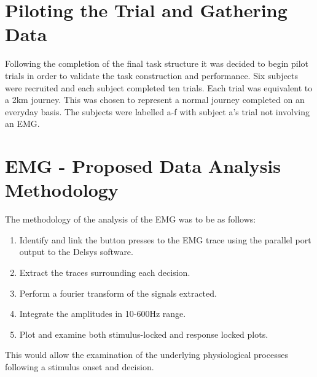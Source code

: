 \section{Piloting the Trial and Gathering Data}
Following the completion of the final task structure it was decided to begin pilot trials in order to validate the task construction and performance. Six subjects were recruited and each subject completed ten trials. Each trial was equivalent to a 2km journey. This was chosen to represent a normal journey completed on an everyday basis. The subjects were labelled a-f with subject a's trial not involving an EMG.


\section{EMG - Proposed Data Analysis Methodology}
The methodology of the analysis of the EMG was to be as follows:
\begin{enumerate}
    \item Identify and link the button presses to the EMG trace using the parallel port output to the Delsys software.
    \item Extract the traces surrounding each decision.
    \item Perform a fourier transform of the signals extracted.
    \item Integrate the amplitudes in 10-600Hz range.
    \item Plot and examine both stimulus-locked and response locked plots.
\end{enumerate}

This would allow the examination of the underlying physiological processes following a stimulus onset and decision.

